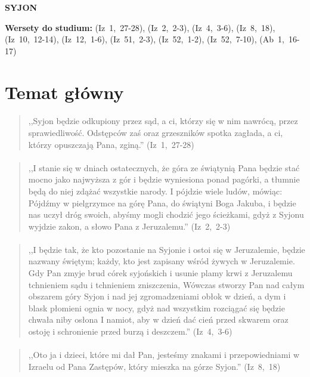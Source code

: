\documentclass[10pt,a4paper,oneside]{article}
\begin{document}
\centerline{\textbf{\MakeUppercase{Syjon}}}
\begin{center}
\textbf{Wersety do studium:} \mbox{(Iz 1, 27-28)}, \mbox{(Iz 2, 2-3)}, \mbox{(Iz 4, 3-6)}, \mbox{(Iz 8, 18)}, \mbox{(Iz 10, 12-14)}, \mbox{(Iz 12, 1-6)}, \mbox{(Iz 51, 2-3)}, \mbox{(Iz 52, 1-2)}, \mbox{(Iz 52, 7-10)}, \mbox{(Ab 1, 16-17)}
\end{center}
\section{Temat główny}
\paragraph{}
\begin{quote}
,,Syjon będzie odkupiony przez sąd, a ci, którzy się w nim nawrócą, przez sprawiedliwość. Odstępców zaś oraz grzeszników spotka zagłada, a ci, którzy opuszczają Pana, zginą.'' \mbox{(Iz 1, 27-28)}
\end{quote}
\paragraph{}
\begin{quote}
,,I stanie się w dniach ostatecznych, że góra ze świątynią Pana będzie stać mocno jako najwyższa z gór i będzie wyniesiona ponad pagórki, a tłumnie będą do niej zdążać wszystkie narody. I pójdzie wiele ludów, mówiąc: Pójdźmy w pielgrzymce na górę Pana, do świątyni Boga Jakuba, i będzie nas uczył dróg swoich, abyśmy mogli chodzić jego ścieżkami, gdyż z Syjonu wyjdzie zakon, a słowo Pana z Jeruzalemu.'' \mbox{(Iz 2, 2-3)}
\end{quote}
\paragraph{}
\begin{quote}
,,I będzie tak, że kto pozostanie na Syjonie i ostoi się w Jeruzalemie, będzie nazwany świętym; każdy, kto jest zapisany wśród żywych w Jeruzalemie. Gdy Pan zmyje brud córek syjońskich i usunie plamy krwi z Jeruzalemu tchnieniem sądu i tchnieniem zniszczenia, Wówczas stworzy Pan nad całym obszarem góry Syjon i nad jej zgromadzeniami obłok w dzień, a dym i blask płomieni ognia w nocy, gdyż nad wszystkim rozciągać się będzie chwała niby osłona I namiot, aby w dzień dać cień przed skwarem oraz ostoję i schronienie przed burzą i deszczem.'' \mbox{(Iz 4, 3-6)}
\end{quote}
\paragraph{}
\begin{quote}
,,Oto ja i dzieci, które mi dał Pan, jesteśmy znakami i przepowiedniami w Izraelu od Pana Zastępów, który mieszka na górze Syjon.'' \mbox{(Iz 8, 18)}
\end{quote}
\end{document}
